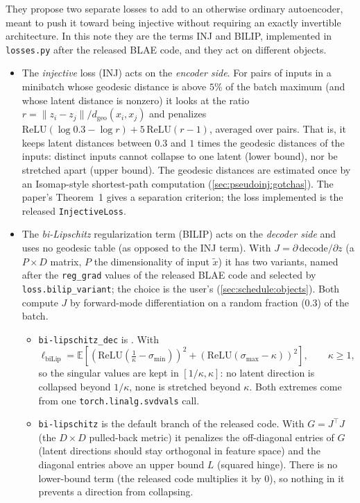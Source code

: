 They propose two separate losses to add to an otherwise ordinary autoencoder, meant to push it
toward being injective without requiring an exactly invertible architecture. In this note they are the
terms INJ and BILIP, implemented in \texttt{losses.py} after the released BLAE code, and they act on
different objects.
\begin{itemize}[leftmargin=1.5em]
\item The \emph{injective} loss (INJ) acts on the \emph{encoder side}. For pairs of inputs in a
      minibatch whose geodesic distance is above $5\%$ of the batch maximum (and whose latent distance
      is nonzero) it looks at the ratio $r=\lVert z_i-z_j\rVert/d_{\mathrm{geo}}(x_i,x_j)$ and penalizes
      $\mathrm{ReLU}(\log 0.3-\log r)+5\,\mathrm{ReLU}(r-1)$, averaged over pairs. That is, it keeps
      latent distances between $0.3$ and $1$ times the geodesic distances of the inputs: distinct
      inputs cannot collapse to one latent (lower bound), nor be stretched apart (upper bound). The
      geodesic distances are estimated once by an Isomap-style shortest-path computation
      (\cref{sec:pseudoinj:gotchas}). The paper's Theorem~1 gives a separation criterion; the loss
      implemented is the released \texttt{InjectiveLoss}.
\item The \emph{bi-Lipschitz} regularization term (BILIP) acts on the \emph{decoder side}
      and uses no geodesic table (as opposed to the INJ term). 
      With $J=\partial\,\mathrm{decode}/\partial z$ (a $P\times D$ matrix, $P$ the dimensionality of 
      input $\tilde x$) it has two variants, named
      after the \texttt{reg\_grad} values of the released BLAE code and selected by
      \texttt{loss.bilip\_variant}; the choice is the user's
      (\cref{sec:schedule:objects}). Both compute $J$ by forward-mode differentiation
      on a random fraction ($0.3$) of the batch.
      \begin{itemize}[leftmargin=1.3em]
      \item \texttt{bi-lipschitz\_dec} is \cite[Eq.~(12)]{zhan2026blae}. With
	        \[
	        \ell_{\mathrm{biLip}}=
	        \mathbb{E}\left[\left(\mathrm{ReLU}\left(\tfrac{1}{\kappa}-\sigma_{\min}\right)\right)^2
	        +\left(\mathrm{ReLU}\left(\sigma_{\max}-\kappa\right)\right)^2\right], 
	        \qquad \kappa\ge1,
	        \]
            so the singular values are kept in $[1/\kappa,\kappa]$: no latent direction is
            collapsed beyond $1/\kappa$, none is stretched beyond $\kappa$. 
            Both extremes come from one \texttt{torch.linalg.svdvals} call.
      \item \texttt{bi-lipschitz} is the default branch of the released code. With
            $G=J^\top J$ (the $D\times D$ pulled-back metric) it penalizes the off-diagonal
            entries of $G$ (latent directions should stay orthogonal in feature space) and
            the diagonal entries above an upper bound $L$ (squared hinge). There is no
            lower-bound term (the released code multiplies it by $0$), so nothing in it
            prevents a direction from collapsing.
      \end{itemize}
\end{itemize}
